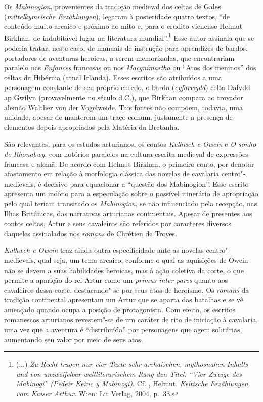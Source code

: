 Os \textit{Mabinogion}, provenientes da tradição medieval dos celtas de Gales
(\textit{mittelkymrische Erzählungen}), legaram à posteridade quatro textos,
“de conteúdo muito arcaico e próximo ao mito e, para o erudito vienense Helmut
Birkhan, de indubitável lugar na literatura mundial”.\footnote{ (...) \textit{Zu
Recht tragen nur vier Texte sehr archaischen, mythosnahen Inhalts und von
unzweifelbar weltliterarischem Rang den Titel: “Vier Zweige des Mabinogi”
(Pedeir Keinc y Mabinogi)}. Cf. , Helmut. \textit{Keltische Erzählungen
vom Kaiser Arthur}. Wien: Lit Verlag, 2004, p.~33. } Esse autor assinala que
se poderia tratar, neste caso, de manuais de instrução para aprendizes de
bardos, portadores de aventuras heroicas, a serem memorizadas, que encontrariam
paralelo nas \textit{Enfances }francesas ou nos \textit{Macgnímartha} ou “Atos
dos meninos” dos celtas da Hibérnia (atual Irlanda). Esses escritos são atribuídos a uma
personagem constante de seu próprio enredo, o bardo (\textit{cyfarwydd}) celta
Dafydd ap Gwilyn (provavelmente no século  d.C.), que Birkhan compara ao
trovador alemão Walther von der Vogelweide. Tais fontes não compõem, todavia,
uma unidade, apesar de manterem um traço comum, justamente a presença de
elementos depois apropriados pela Matéria da Bretanha. 

 São relevantes, para os estudos arturianos, os contos \textit{Kulhwch e Owein}
e \textit{O sonho de Rhonabwy}, com notórios paralelos na cultura escrita
medieval de expressões francesa e alemã. De acordo com Helmut Birkhan, o
primeiro conto, por denotar afastamento em relação à morfologia clássica das
novelas de cavalaria centro"-medievais, é decisivo para equacionar a “questão
dos Mabinogion”. Esse escrito apresenta um indício para a especulação sobre o
possível itinerário de apropriação pelo qual teriam transitado os
\textit{Mabinogion}, se não influenciado pela recepção, nas Ilhas Britânicas,
das narrativas arturianas continentais. Apesar de presentes aos contos celtas, Artur e seus
cavaleiros são referidos por caracteres diversos daqueles assinalados nos
\textit{romans} de Chrétien de Troyes.

\textit{Kulhwch e Owein }traz ainda outra especificidade ante as novelas
centro"-medievais, qual seja, um tema arcaico, conforme o qual as aquisições de
Owein não se devem a suas habilidades heroicas, mas à ação coletiva da corte, o
que permite a aparição do rei Artur como um \textit{primus inter pares} quanto
aos cavaleiros dessa corte, destacando"-se por seus atos de heroísmo. Os
\textit{romans} da tradição continental apresentam um Artur que se aparta das
batalhas e se vê ameaçado quando ocupa a posição de protagonista. Com efeito,
os escritos romanescos arturianos revestem"-se de um caráter de rito de
iniciação à cavalaria, uma vez que a aventura é “distribuída” por personagens que
agem solitárias, aumentando seu valor por meio de seus atos. 

